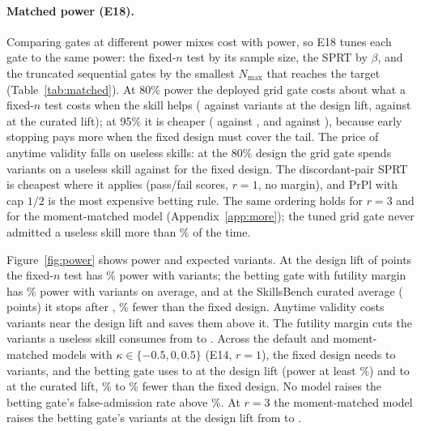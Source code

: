 \paragraph{Matched power (E18).} Comparing gates at different power mixes cost with power, so E18 tunes each gate to the same power: the fixed-$n$ test by its sample size, the SPRT by $\beta$, and the truncated sequential gates by the smallest $N_{\max}$ that reaches the target (Table~\ref{tab:matched}). At 80\% power the deployed grid gate costs about what a fixed-$n$ test costs when the skill helps (\NMpDesEightyGrid{} against \NMpDesEightyFixed{} variants at the design lift, \NMpCurEightyGrid{} against \NMpCurEightyFixed{} at the curated lift); at 95\% it is cheaper (\NMpDesNinetyFiveGrid{} against \NMpDesNinetyFiveFixed, and \NMpCurNinetyFiveGrid{} against \NMpCurNinetyFiveFixed), because early stopping pays more when the fixed design must cover the tail. The price of anytime validity falls on useless skills: at the 80\% design the grid gate spends \NMpDesEightyGridNull{} variants on a useless skill against \NMpDesEightyFixedNull{} for the fixed design. The discordant-pair SPRT is cheapest where it applies (pass/fail scores, $r=1$, no margin), and PrPl with cap $1/2$ is the most expensive betting rule. The same ordering holds for $r=3$ and for the moment-matched model (Appendix~\ref{app:more}); the tuned grid gate never admitted a useless skill more than \NMpNullMaxGrid\% of the time.
\begin{table}[t]
\centering\small
\caption{Expected variants at matched power (E18; default model, $r=1$, 4{,}000 exams per cell): when the skill has the stated lift, and in parentheses for a useless skill ($\Delta=0$) with the same tuning. The SPRT assumes pass/fail scores and no margin.}
\label{tab:matched}

\end{table}

Figure~\ref{fig:power} shows power and expected variants. At the design lift of \PLiftOne{} points the fixed-$n$ test has \NETwoPowFixed\% power with \NFixedN{} variants; the betting gate with futility margin has \NETwoPowBet\% power with \NETwoNBetLOne{} variants on average, and at the SkillsBench curated average (\PCurated{} points) it stops after \NETwoNBetCur{}, \NETwoSaveCur\% fewer than the fixed design. Anytime validity costs variants near the design lift and saves them above it. The futility margin cuts the variants a useless skill consumes from \NETwoNBetZero{} to \NETwoNBetFutZero. Across the default and moment-matched models with $\kappa\in\{-0.5,0,0.5\}$ (E14, $r=1$), the fixed design needs \NRvSensNFixedLo{} to \NRvSensNFixedHi{} variants, and the betting gate uses \NRvSensNBetLo{} to \NRvSensNBetHi{} at the design lift (power at least \NRvSensPowBetLo\%) and \NRvSensNCurLo{} to \NRvSensNCurHi{} at the curated lift, \NRvSensSaveLo\% to \NRvSensSaveHi\% fewer than the fixed design. No model raises the betting gate's false-admission rate above \NRvSensNullMax\%. At $r=3$ the moment-matched model raises the betting gate's variants at the design lift from \NRvDefRThreeNBet{} to \NRvFitRThreeNBet.

